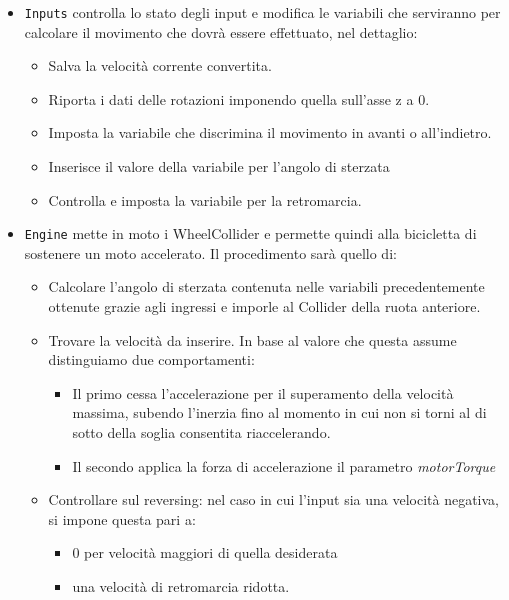 \begin{itemize}
	\item \texttt{Inputs} controlla lo stato degli input e modifica le variabili che serviranno per calcolare il movimento che dovrà essere effettuato, nel dettaglio:
		\begin{itemize}
			\item Salva la velocità corrente convertita.
			\item Riporta i dati delle rotazioni imponendo quella sull’asse z a 0.
			\item Imposta la variabile che discrimina il movimento in avanti o all’indietro.
			\item Inserisce il valore della variabile per l’angolo di sterzata
			\item Controlla e imposta la variabile per la retromarcia.
		\end{itemize}
		
	\item \texttt{Engine} mette in moto i WheelCollider e permette quindi alla bicicletta di sostenere un moto accelerato. Il procedimento sarà quello di:
		\begin{itemize}
			\item Calcolare l’angolo di sterzata contenuta nelle variabili precedentemente ottenute grazie agli ingressi e imporle al Collider della ruota anteriore.
			\item Trovare la velocità da inserire. In base al valore che questa assume distinguiamo due comportamenti:
			\begin{itemize}
			  \item Il primo cessa l’accelerazione per il superamento della velocità massima, subendo l’inerzia fino al momento in cui non si torni al di sotto della soglia consentita riaccelerando.
			  \item Il secondo applica la forza di accelerazione il parametro \textit{motorTorque}
			\end{itemize}
			\item Controllare sul reversing: nel caso in cui l’input sia una velocità negativa, si impone questa pari a:
			\begin{itemize}
			  \item 0 per velocità maggiori di quella desiderata
			  \item una velocità di retromarcia ridotta.
			\end{itemize}
		\end{itemize}
		

\end{itemize}
